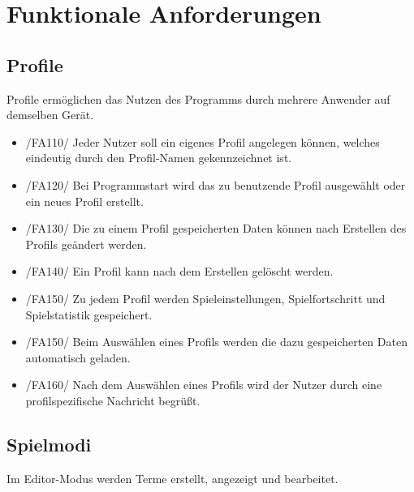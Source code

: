 \section{Funktionale Anforderungen}

\subsection{Profile}

Profile ermöglichen das Nutzen des Programms durch mehrere Anwender auf demselben Gerät.

\begin{itemize}
\item /FA110/ Jeder Nutzer soll ein eigenes Profil angelegen können, welches eindeutig durch den Profil-Namen gekennzeichnet ist. 
\item /FA120/ Bei Programmstart wird das zu benutzende Profil ausgewählt oder ein neues Profil erstellt.
\item /FA130/ Die zu einem Profil gespeicherten Daten können nach Erstellen des Profils geändert werden.
\item /FA140/ Ein Profil kann nach dem Erstellen gelöscht werden.
\item /FA150/ Zu jedem Profil werden Spieleinstellungen, Spielfortschritt und Spielstatistik gespeichert.
\item /FA150/ Beim Auswählen eines Profils werden die dazu gespeicherten Daten automatisch geladen.
\item /FA160/ Nach dem Auswählen eines Profils wird der Nutzer durch eine profilspezifische Nachricht begrüßt.
\end{itemize}

\subsection{Spielmodi}

Im Editor-Modus werden Terme erstellt, angezeigt und bearbeitet.


